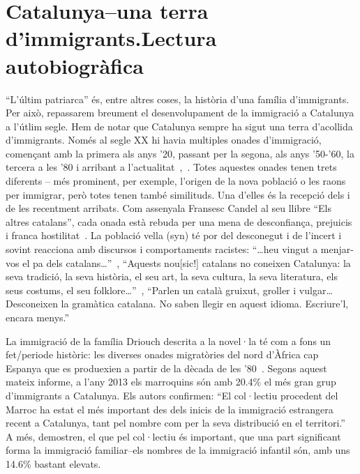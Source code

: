 \section{Catalunya--una terra d'immigrants.Lectura autobiogràfica}

``L'últim patriarca'' és, entre altres coses, la història d'una família d'immigrants.
Per això, repassarem breument el desenvolupament de la immigració a Catalunya a l'útlim segle.
Hem de notar que Catalunya sempre ha sigut una terra d'acollida d'immigrants.
Només al segle XX hi havia multiples onades d'immigració, començant amb la primera als anys '20, passant per la segona, als anys '50-'60, la tercera a les '80 i arribant a l'actualitat~\autocite[123--126]{Candel1985},~\autocite{TarPaGa2013}.
Totes aquestes onades tenen trets diferents -- més prominent, per exemple, l'origen de la nova població o les raons per immigrar, però totes tenen també similituds.
Una d'elles és la recepció dels i de les recentment arribats.
Com assenyala Fransesc Candel al seu llibre ``Els altres catalans'', cada onada està rebuda per una mena de desconfiança, prejuicis i franca hostilitat~\autocite[17]{Candel1965}.
La població vella (syn) té por del desconegut i de l'incert i sovint reacciona amb discursos i comportaments racistes:
``\ldots heu vingut a menjar-vos el pa dels catalans\ldots''~\autocite[17]{Candel1965},
``Aquests nou[sic!] catalans no coneixen Catalunya: la seva tradició, la seva història, el seu art, la seva cultura, la seva literatura, els seus costums, el seu folklore\ldots''~\autocite[17]{Candel1965},
``Parlen un català gruixut, groller i vulgar\ldots Desconeixen la gramàtica catalana. No saben llegir en aquest idioma. Escriure'l, encara menys.''~\autocite[18]{Candel1965}

La immigració de la família Driouch descrita a la novel·la té com a fons un fet/periode històric:
les diverses onades migratòries del nord d'Àfrica cap Espanya que es produexien a partir de la dècada de les '80~\autocite{TarPaGa2013}.
Segons aquest mateix informe, a l'any 2013 els marroquins són amb 20.4\% el més gran grup d'immigrants a Catalunya.
Els autors confirmen:
``El col·lectiu procedent del Marroc ha estat el més important des dels inicis de la immigració estrangera recent a Catalunya, tant pel nombre com per la seva distribució en el territori.''~\autocite{TarPaGa2013}
A més, demostren, el que pel col·lectiu és important, que una part significant forma la immigració familiar--els nombres de la immigració infantil són, amb uns 14.6\% bastant elevats.

